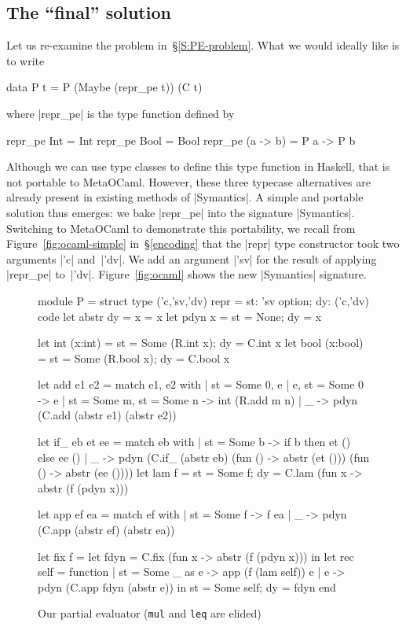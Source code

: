\subsection{The ``final'' solution}
\label{S:PE-solution}
Let us re-examine the problem in~\S\ref{S:PE-problem}. What we
would ideally like is to write
\begin{code}
data P t = P (Maybe (repr_pe t)) (C t)
\end{code}
where |repr_pe| is the type function defined
by
\begin{code}
repr_pe Int      = Int
repr_pe Bool     = Bool
repr_pe (a -> b) = P a -> P b
\end{code}
Although we can use type classes to define this type function
in Haskell, that is not portable to MetaOCaml. However,
these three typecase alternatives are already present in existing
methods of |Symantics|.
A simple and portable solution thus emerges: we bake |repr_pe| 
into the signature |Symantics|. Switching to MetaOCaml to demonstrate this
portability, we recall from Figure~\ref{fig:ocaml-simple} in~\S\ref{encoding} that the |repr| type
constructor took two arguments |'c| and~|'dv|. We add an argument
|'sv| for the result of applying |repr_pe| to~|'dv|.
Figure~\ref{fig:ocaml} shows the new |Symantics| signature.

\begin{figure}
\begin{floatrule}
\begin{code}
module P = struct
  type ('c,'sv,'dv) repr = {st: 'sv option; dy: ('c,'dv) code}
  let abstr {dy = x} = x
  let pdyn x = {st = None; dy = x}

  let int  (x:int)  = {st = Some (R.int x);  dy = C.int x}
  let bool (x:bool) = {st = Some (R.bool x); dy = C.bool x}

  let add e1 e2 = match e1, e2 with
  | {st = Some 0}, e | e, {st = Some 0} -> e
  | {st = Some m}, {st = Some n} -> int (R.add m n)
  | _ -> pdyn (C.add (abstr e1) (abstr e2))

  let if_ eb et ee = match eb with
  | {st = Some b} -> if b then et () else ee ()
  | _ -> pdyn (C.if_ (abstr eb) (fun () -> abstr (et ()))
                                (fun () -> abstr (ee ())))
  let lam f = {st = Some f; 
               dy = C.lam (fun x -> abstr (f (pdyn x)))}

  let app ef ea = match ef with
  | {st = Some f} -> f ea
  | _ -> pdyn (C.app (abstr ef) (abstr ea))

  let fix f = 
    let fdyn = C.fix (fun x -> abstr (f (pdyn x)))
    in let rec self = function
       | {st = Some _} as e -> app (f (lam self)) e
       | e -> pdyn (C.app fdyn (abstr e))
       in {st = Some self; dy = fdyn}
end
\end{code}
\end{floatrule}
\caption{Our partial evaluator (\texttt{mul} and \texttt{leq} are elided)}
\label{fig:pe}
\end{figure}

